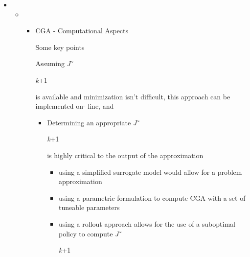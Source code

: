 \documentclass[12pt,twoside]{article}
\begin{document}
\vspace{\baselineskip}
\begin{itemize}
	\item \begin{itemize}
	\item \begin{itemize}
	\item CGA - Computational Aspects\par


\vspace{\baselineskip}
{\fontsize{10pt}{12.0pt}\selectfont Some key points\par}\par


\vspace{\baselineskip}
Assuming \textit{J}˜{\fontsize{7pt}{8.4pt}\selectfont \textit{k}+1 \par}is available and minimization isn’t difficult, this approach can be implemented on- line, and\par

\begin{itemize}
	\item {\fontsize{10pt}{12.0pt}\selectfont Determining an appropriate \textit{J}˜{\fontsize{7pt}{8.4pt}\selectfont \textit{k}+1 {\fontsize{10pt}{12.0pt}\selectfont is highly critical to the output of the approximation\par}\par}\par}\par

\begin{itemize}
	\item {\fontsize{10pt}{12.0pt}\selectfont using a simplified surrogate model would allow for a problem approximation\par}\par

	\item {\fontsize{10pt}{12.0pt}\selectfont using a parametric formulation to compute CGA with a set of tuneable parameters\par}\par

	\item {\fontsize{10pt}{12.0pt}\selectfont using a rollout approach allows for the use of a suboptimal policy to compute \textit{J}˜{\fontsize{7pt}{8.4pt}\selectfont \textit{k}+1\par}\par}\par



\end{itemize}
\end{itemize}
\end{itemize}
\end{itemize}
\end{itemize}
\end{document}
